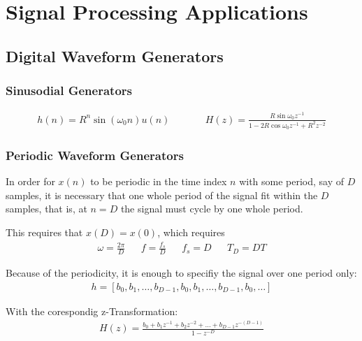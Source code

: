 \section{Signal Processing Applications}
\subsection{Digital Waveform Generators}
\subsubsection{Sinusodial Generators}
\begin{align*}
	h(n) = R^n \sin(\omega_0 n)u(n) \qquad
	&& H(z) = \frac{R \sin \omega_0 z^{-1}}{1-2R\cos \omega_0 z^{-1} + R^2 z^{-2}}
\end{align*}

\subsubsection{Periodic Waveform Generators}
In order for $x(n)$ to be periodic in the time index $n$ with some period, say of $D$ samples,
it is necessary that one whole period of the signal fit within the $D$ samples, that is,
at $n = D$ the signal must cycle by one whole period.

This requires that $x(D) = x(0)$, which requires
\begin{align*}
	\omega = \frac{2\pi}{D} && f = \frac{f_s}{D} && f_s = D && T_D = DT
\end{align*}


Because of the periodicity, it is enough to specifiy the signal over one period only:
\begin{align*}
	h = [b_0, b_1, \ldots, b_{D-1}, b_0, b_1, \ldots, b_{D-1}, b_0, \ldots]
\end{align*}

With the corespondig z-Transformation:
\begin{align*}
	H(z) = \frac{b_0 + b_1 z^{-1} + b_2 z^{-2} + \ldots + b_{D-1} z^{-(D-1)}}{1 - z^{-D}}
\end{align*}

